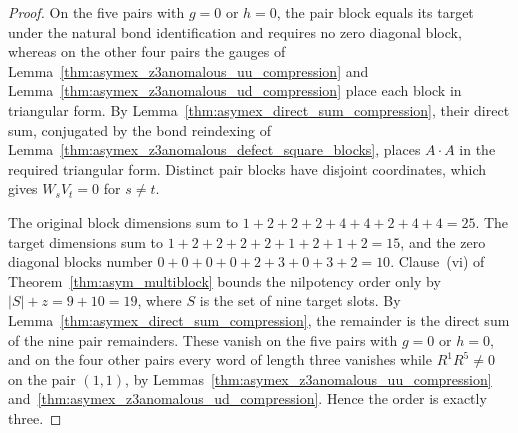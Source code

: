 \begin{proof}
    \leanok
    On the five pairs with $g=0$ or $h=0$, the pair block equals its
    target under the natural bond identification and requires no zero
    diagonal block, whereas on the other four pairs the gauges of
    Lemma~\ref{thm:asymex_z3anomalous_uu_compression} and
    Lemma~\ref{thm:asymex_z3anomalous_ud_compression} place each block in
    triangular form. By Lemma~\ref{thm:asymex_direct_sum_compression},
    their direct sum, conjugated by the bond reindexing of
    Lemma~\ref{thm:asymex_z3anomalous_defect_square_blocks}, places
    $A\cdot A$ in the required triangular form. Distinct pair blocks have
    disjoint coordinates, which gives $W_sV_t=0$ for $s\neq t$.

    The original block dimensions sum to
    $1+2+2+2+4+4+2+4+4=25$.
    The target dimensions sum to $1+2+2+2+2+1+2+1+2=15$,
    and the zero diagonal blocks number $0+0+0+0+2+3+0+3+2=10$.
    Clause~(vi) of Theorem~\ref{thm:asym_multiblock} bounds the
    nilpotency order only by $|S|+z=9+10=19$, where $S$ is the set of
    nine target slots. By
    Lemma~\ref{thm:asymex_direct_sum_compression}, the remainder is the
    direct sum of the nine pair remainders. These vanish on the five pairs
    with $g=0$ or $h=0$, and on the four other pairs every word of length
    three vanishes while $R^1R^5\neq0$ on the pair $(1,1)$, by
    Lemmas~\ref{thm:asymex_z3anomalous_uu_compression}
    and~\ref{thm:asymex_z3anomalous_ud_compression}. Hence the order is
    exactly three.
\end{proof}
